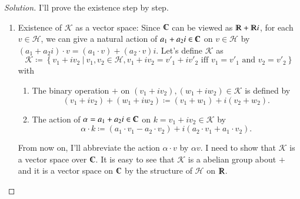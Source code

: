 \documentclass[a4paper, 12pt]{article}
\theoremstyle{Mydefinition}
\theoremstyle{Mytheorem}
\begin{document}
\begin{proof}[Solution]
I'll prove the existence step by step.
\begin{enumerate}
    \item Existence of $\mathscr{K}$ as a vector space: Since $\varmathbb{C}$ can be viewed as $\varmathbb{R}+\varmathbb{R}i$, for each $v\in\mathscr{H}$, we can give a natural action of $a_1+a_2i\in\varmathbb{C}$ on $v\in\mathscr{H}$ by $(a_1+a_2i)\cdot v = (a_1\cdot v) + (a_2\cdot v)i$. Let's define $\mathscr{K}$ as
    \begin{equation}
        \mathscr{K}\coloneqq \left\{v_1 + i v_2~|~v_1,v_2\in\mathscr{H}, v_1+iv_2 = v'_1+iv'_2 \textrm{ iff }v_1=v'_1 \textrm{ and }v_2=v'_2\right\}
    \end{equation}
    with 
    \begin{enumerate}
        \item The binary operation $+$ on $(v_1 + i v_2), (w_1 + i w_2)\in\mathscr{K}$ is defined by
        \begin{equation}
            (v_1 + i v_2) + (w_1 + i w_2) \coloneqq (v_1 + w_1) + i(v_2 + w_2).
        \end{equation}
        \item The action of $\alpha=a_1+a_2i\in\varmathbb{C}$ on $k=v_1 + i v_2\in\mathscr{K}$ by
        \begin{equation}
            \alpha\cdot k \coloneqq (a_1\cdot v_1-a_2\cdot v_2)+i(a_2\cdot v_1+a_1\cdot v_2).
        \end{equation}
    \end{enumerate}
    
    From now on, I'll abbreviate the action $\alpha\cdot v$ by $\alpha v$. I need to show that $\mathscr{K}$ is a vector space over $\varmathbb{C}$. It is easy to see that $\mathscr{K}$ is a abelian group about $+$ and it is a vector space on $\varmathbb{C}$ by the structure of $\mathscr{H}$ on $\varmathbb{R}$.
    

\end{enumerate}
\end{proof}
\end{document}
